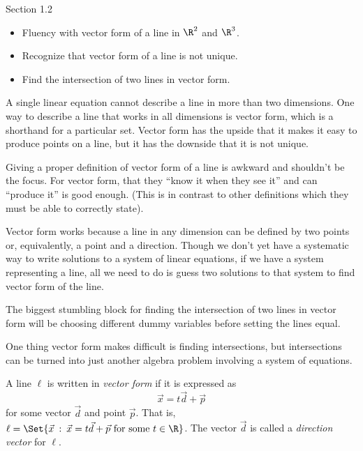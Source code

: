 \documentclass{problemset}
\providecommand\given{}
\newcommand\SetSymbol[1][]{%
	\nonscript\::%
	\allowbreak
	\nonscript\:
	\mathopen{}}
\renewcommand\given{\SetSymbol[\delimsize]}
\begin{document}
\begin{lesson}

	Section 1.2

	\begin{itemize}
		\item Fluency with vector form of a line in $\R^2$ and $\R^3$.
		\item Recognize that vector form of a line is not unique.
		\item Find the intersection of two lines in vector form.
	\end{itemize}

	A single linear equation cannot describe a line in more than two dimensions.
	One way to describe a line that works in all dimensions is vector form, which
	is a shorthand for a particular set. Vector form has the upside that it makes it easy
	to produce points on a line, but it has the downside that it is not unique.

	\begin{annotation}
		\begin{notes}
			Giving a proper definition of vector form of a line is awkward and
			shouldn't be the focus. For vector form, that they ``know it when they see it''
			and can ``produce it'' is good enough. (This is in contrast to other definitions
			which they must be able to correctly state).
		\end{notes}
	\end{annotation}
	Vector form works because a line in any dimension can be defined by two
	points or, equivalently, a point and a direction. Though we don't yet have
	a systematic way to write solutions to a system of linear equations,
	if we have a system representing a line, all we need to do is guess two
	solutions to that system to find vector form of the line.


	\begin{annotation}
		\begin{notes}
			The biggest stumbling block for finding the intersection of two lines
			in vector form will be choosing different dummy variables before
			setting the lines equal.
		\end{notes}
	\end{annotation}
	One thing vector form makes difficult is finding intersections, but intersections
	can be turned into just another algebra problem involving a system of equations.

\end{lesson}
	\begin{definition}
		A line $\ell$ is written in \emph{vector form} if it is expressed
		as
		\[
			\vec x=t\vec d+\vec p
		\]
		for some vector $\vec d$ and point $\vec p$. That is, $\ell = \Set{\vec x\given \vec x=
		t\vec d+\vec p\text{ for some } t\in\R }$. The vector
		$\vec d$ is called a \emph{direction
		vector} for $\ell$.
	\end{definition}
\end{document}
